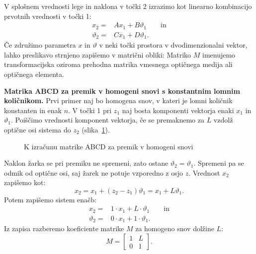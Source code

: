 V splošnem vrednosti lege in naklona v točki 2 izrazimo kot 
linearno kombinacijo prvotnih vrednosti v točki 1:
\begin{align}
 x_2 = & A x_1 + B \vartheta_1 \qquad \mathrm{in}  \label{eq:02_29}\\
 \vartheta_2 = & C x_1 + D\vartheta_1.
 \label{eq:02_30}
\end{align}
Če združimo parametra $x$ in $\vartheta$ v neki točki prostora
v dvodimenzionalni vektor,
lahko preslikavo strnjeno zapišemo v matrični obliki:
Matriko $M$ imenujemo transformacijska oziroma prehodna matrika 
vmesnega optičnega medija ali optičnega elementa. 

\begin{example}
\label{ex:ML}
{\bf Matrika ABCD za premik v homogeni snovi s konstantnim lomnim količnikom.} 
Prvi primer naj bo homogena snov, v kateri je lomni količnik konstanten in enak $n$. 
V točki 1 pri $z_1$ naj bosta komponenti vektorja enaki $x_1$ in 
$\vartheta_1$. Poiščimo vrednosti komponent vektorja, 
če se premaknemo za $L$ vzdolž optične osi sistema do $z_2$ 
(slika~\ref{fig:01_ABCD1}). 
\begin{figure}[ht]
\centering
\def\svgwidth{70truemm} 

\caption{K izračunu matrike ABCD za premik v homogeni snovi}
\label{fig:01_ABCD1}
\end{figure}

Naklon žarka se pri premiku ne spremeni, zato ostane $\vartheta_2 = \vartheta_1$. Spremeni
pa se odmik od optične osi, saj žarek ne potuje vzporedno z osjo $z$. 
Vrednost $x_2$ zapišemo kot:
\begin{equation}
 x_2 = x_1 + (z_2-z_1)\vartheta_1 = x_1 + L\vartheta_1.
\label{eq:02_32}
\end{equation}
Potem zapišemo sistem enačb:
\begin{align}
 x_2 =& 1\cdot x_1 + L\cdot \vartheta_1 \qquad \mathrm{in} \label{eq:02_33}\\
 \vartheta_2 =& 0\cdot x_1 + 1\cdot \vartheta_1.
 \label{eq:02_34}
\end{align}
Iz zapisa razberemo koeficiente matrike $M$ za homogeno snov dolžine $L$:
\begin{equation}
 M = \left[\begin{array}{cc}
1& L\\
0&1
\end{array}\right]\!\!.
 \label{eq:02_35}
\end{equation}
\end{example}

